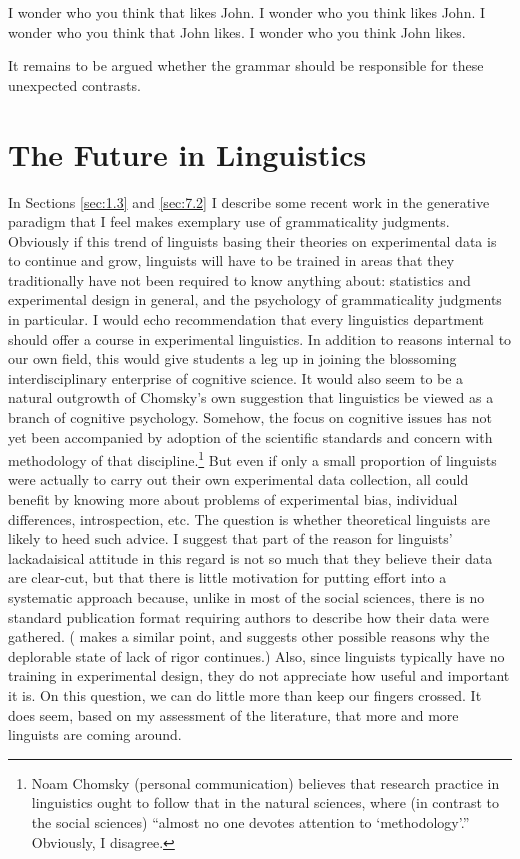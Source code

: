  \ea\label{ex:6:3}
 \ea I wonder who you think that likes John.
 \ex I wonder who you think likes John.
 \ex I wonder who you think that John likes. 
 \ex I wonder who you think John likes.
 \z
 \z
 
 \noindent
 It remains to be argued whether the grammar should be responsible for these unexpected contrasts.

 \section{The Future in Linguistics}\label{sec:7.3}

 In Sections \ref{sec:1.3} and \ref{sec:7.2}
 I describe some recent work in the generative paradigm that I feel makes exemplary use of grammaticality judgments. Obviously if this trend of linguists basing their theories on experimental data is to continue and grow, linguists will have to be trained in areas that they traditionally have not been required to know anything about: statistics and experimental design in general, and the psychology of grammaticality judgments in particular. I would echo  recommendation that every linguistics department should offer a course in experimental linguistics. In addition to reasons internal to our own field, this would give students a leg up in joining the blossoming interdisciplinary enterprise of cognitive science. It would also seem to be a natural outgrowth of Chomsky's own suggestion that linguistics be viewed as a branch of cognitive psychology. Somehow, the focus on cognitive issues has not yet been accompanied by adoption of the scientific standards and concern with methodology of that discipline.\footnote{Noam Chomsky (personal communication) believes that research practice in linguistics ought to follow that in the natural sciences, where (in contrast to the social sciences) ``almost no one devotes attention to `methodology'.'' Obviously, I disagree.}
  But even if only a small proportion of linguists were
 actually to carry out their own experimental data collection, all could benefit by knowing more about problems of experimental bias, individual differences, introspection, etc. The question is whether theoretical linguists are likely to heed such advice. I suggest that part of the reason for linguists' lackadaisical attitude in this regard is not so much that they believe their data are clear-cut, but that there is little motivation for putting effort into a systematic approach because, unlike in most of the social sciences, there is no standard publication format requiring authors to describe how their data were gathered. (\citet{Grandy1981} makes a similar point, and suggests other possible reasons why the deplorable state of lack of rigor continues.) Also, since linguists typically have no training in experimental design, they do not appreciate how useful and important it is. On this question, we can do little more than keep our fingers crossed. It does seem, based on my assessment of the literature, that more and more linguists are coming around.

